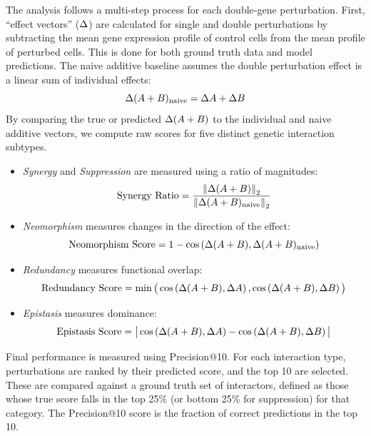 The analysis follows a multi-step process for each double-gene perturbation.
First, ``effect vectors'' ($\Delta$) are calculated for single and double perturbations by subtracting the mean gene expression profile of control cells from the mean profile of perturbed cells.
This is done for both ground truth data and model predictions.
The naive additive baseline assumes the double perturbation effect is a linear sum of individual effects:
\begin{equation}
    \Delta(A+B)_{\text{naive}} = \Delta A + \Delta B
    \label{eq:app:naive_additive}
\end{equation}
By comparing the true or predicted $\Delta(A+B)$ to the individual and naive additive vectors, we compute raw scores for five distinct genetic interaction subtypes.
\begin{itemize}
    \item \emph{Synergy} and \emph{Suppression} are measured using a ratio of magnitudes:
    \begin{equation}
        \text{Synergy Ratio} = \frac{\left\lVert \Delta(A+B) \right\rVert_2}{\left\lVert \Delta(A+B)_{\text{naive}} \right\rVert_2}
        \label{eq:app:synergy_ratio}
    \end{equation}

    \item \emph{Neomorphism} measures changes in the direction of the effect:
    \begin{equation}
        \text{Neomorphism Score} = 1 - \cos\left(\Delta(A+B), \Delta(A+B)_{\text{naive}}\right)
        \label{eq:app:neomorphism}
    \end{equation}

    \item \emph{Redundancy} measures functional overlap:
    \begin{equation}
        \text{Redundancy Score} = \min \big( \cos\left(\Delta(A+B), \Delta A\right), \cos\left(\Delta(A+B), \Delta B\right) \big)
        \label{eq:app:redundancy}
    \end{equation}

    \item \emph{Epistasis} measures dominance:
    \begin{equation}
        \text{Epistasis Score} = \big\lvert \cos\left(\Delta(A+B), \Delta A\right) - \cos\left(\Delta(A+B), \Delta B\right) \big\rvert
        \label{eq:app:epistasis}
    \end{equation}
\end{itemize}
Final performance is measured using Precision@10.
For each interaction type, perturbations are ranked by their predicted score, and the top 10 are selected.
These are compared against a ground truth set of interactors, defined as those whose true score falls in the top 25\% (or bottom 25\% for suppression) for that category.
The Precision@10 score is the fraction of correct predictions in the top 10.

